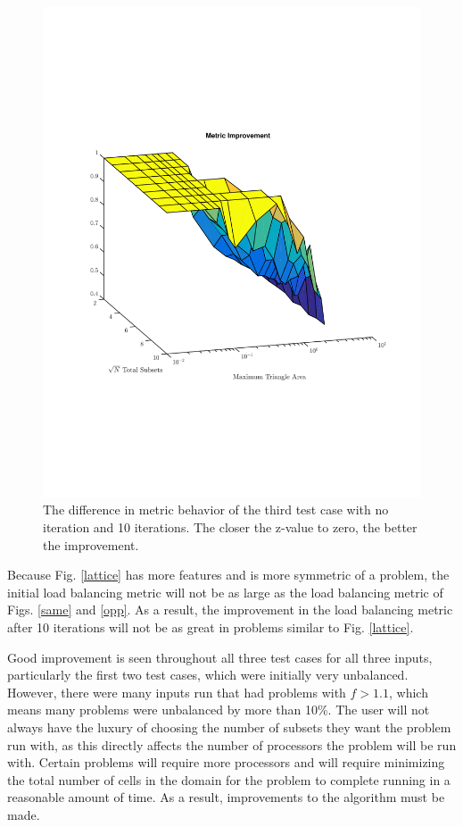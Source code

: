 \documentclass{anstrans}
\begin{document}
\begin{figure}[H]
\centering
\includegraphics[scale=0.50, trim = 2cm 6cm 2cm 7cm,clip]{figures/lattice_diff.pdf}
\caption{The difference in metric behavior of the third test case with no iteration and 10 iterations. The closer the z-value to zero, the better the improvement.}
\label{latticediff}
\end{figure}

Because Fig. \ref{lattice} has more features and is more symmetric of a problem, the initial load balancing metric will not be as large as the load balancing metric of Figs. \ref{same} and \ref{opp}. As a result, the improvement in the load balancing metric after 10 iterations will not be as great in problems similar to Fig. \ref{lattice}. 

Good improvement is seen throughout all three test cases for all three inputs, particularly the first two test cases, which were initially very unbalanced. However, there were many inputs run that had problems with $f > 1.1$, which means many problems were unbalanced by more than 10\%. The user will not always have the luxury of choosing the number of subsets they want the problem run with, as this directly affects the number of processors the problem will be run with. Certain problems will require more processors and will require minimizing the total number of cells in the domain for the problem to complete running in a reasonable amount of time. As a result, improvements to the algorithm must be made. 
\end{document}
